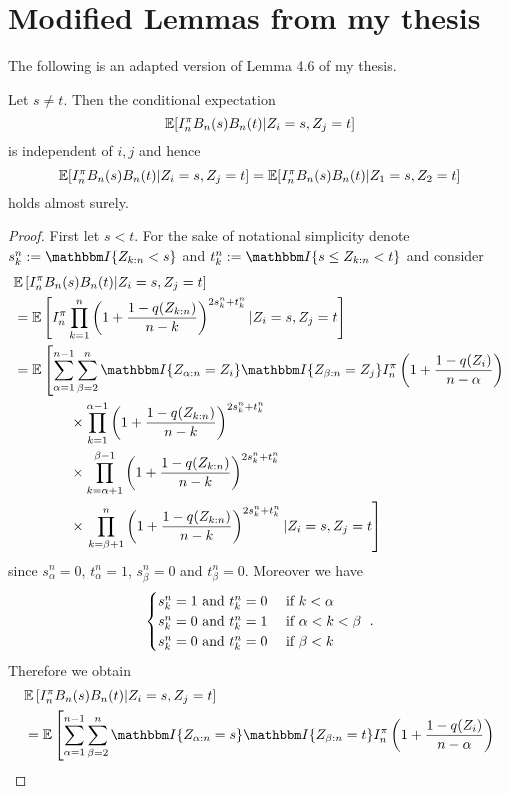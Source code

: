 \section{Modified Lemmas from my thesis}
The following is an adapted version of Lemma 4.6 of my thesis.
\begin{lemma}
	\label{lem:bnbn_change_order}
	Let $s\neq t$. Then the conditional expectation 
	$$\mathbb{E}[I_n^\pi B_n(s)B_n(t) | Z_i=s, Z_j=t]$$ 
	is independent of $i,j$ and hence
	$$\mathbb{E}[I_n^\pi B_n(s)B_n(t) | Z_i=s, Z_j=t] = \mathbb{E}[I_n^\pi B_n(s)B_n(t) | Z_1=s, Z_2=t]$$
	holds almost surely.
	\begin{proof}
		First let $s<t$. For the sake of notational simplicity denote $s_k^n := \I{Z_{k:n} < s}$ and $t_k^n := \I{s\leq Z_{k:n} < t}$ and consider
		\begin{align*}
		&\E\left[I_n^\pi B_n(s)B_n(t)|Z_i=s, Z_j=t\right]\\
		&= \E\left[I_n^\pi\prod_{k=1}^{n}\left(1+\frac{1-q(Z_{k:n})}{n-k}\right)^{2s_k^n + t_k^n} | Z_i=s, Z_j=t\right]\\
		&= \E\left[\sum_{\alpha=1}^{n-1} \sum_{\beta=2}^{n} \I{Z_{\alpha:n} = Z_i} \I{Z_{\beta:n} = Z_j} I_n^\pi \left(1+\frac{1-q(Z_i)}{n-\alpha}\right)\right.\\ 
		&\qquad\qquad \times \prod_{k=1}^{\alpha-1}\left(1+\frac{1-q(Z_{k:n})}{n-k}\right)^{2s_k^n + t_k^n} \\
		&\qquad\qquad \times \prod_{k=\alpha+1}^{\beta-1}\left(1+\frac{1-q(Z_{k:n})}{n-k}\right)^{2s_k^n + t_k^n} \\
		&\qquad\qquad \times  \left.\prod_{k=\beta+1}^{n}\left(1+\frac{1-q(Z_{k:n})}{n-k}\right)^{2s_k^n + t_k^n} | Z_i=s, Z_j=t\right]
		\end{align*}
		since $s_{\alpha}^n = 0$, $t_{\alpha}^n=1$, $s_{\beta}^n = 0$ and $t_{\beta}^n=0$. Moreover we have 
		\[ \begin{cases} 
		s_{k}^n = 1 \textrm{ and } t_{k}^n = 0 & \textrm{ if } k < \alpha  \\
		s_{k}^n = 0 \textrm{ and } t_{k}^n = 1 & \textrm{ if } \alpha < k < \beta\\
		s_{k}^n = 0 \textrm{ and } t_{k}^n = 0 & \textrm{ if } \beta < k \\
		\end{cases}\textrm{ .}
		\]		
		Therefore we obtain
		\begin{align*}
		&\E\left[I_n^\pi B_n(s)B_n(t)|Z_i=s, Z_j=t\right]\\
		&= \E\left[\sum_{\alpha=1}^{n-1} \sum_{\beta=2}^{n} \I{Z_{\alpha:n} = s} \I{Z_{\beta:n} = t} I_n^\pi \left(1+\frac{1-q(Z_i)}{n-\alpha}\right)\right.\\ 

\end{align*}
\end{proof}
\end{lemma}
